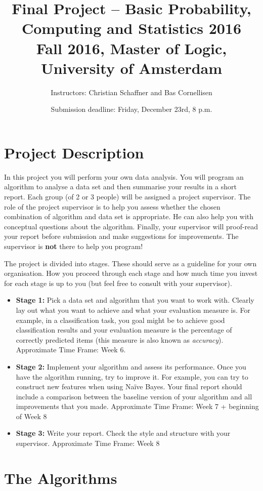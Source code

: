 \documentclass[11pt, leqno, a4paper]{article}
\title{Final Project -- Basic Probability, Computing and Statistics 2016 \\[2mm]
\large{Fall 2016, Master of Logic, University of Amsterdam}}
\author{Instructors: Christian Schaffner and Bas Cornellisen}
\date{Submission deadline: Friday, December 23rd, 8 p.m.}
\begin{document}
\maketitle

\section{Project Description}

In this project you will perform your own data analysis. You will program an algorithm to analyse a data set and then summarise your results in a short report.
Each group (of 2 or 3 people) will be assigned a project supervisor. The role of the project supervisor is to help you assess whether the chosen combination
of algorithm and data set is appropriate. He can also help you with conceptual questions about the algorithm. Finally, your supervisor will proof-read your report
before submission and make suggestions for improvements. The supervisor is \textbf{not} there to help you program!

The project is divided into stages. These should serve as a guideline for your own organisation. How you proceed through each stage and how much time you invest for each
stage is up to you (but feel free to consult with your supervisor).
\begin{itemize}
\item \textbf{Stage 1:} Pick a data set and algorithm that you want to work with. Clearly lay out what you want to achieve and what your evaluation measure is. For example,
in a classification task, you goal might be to achieve good classification results and your evaluation measure is the percentage of correctly predicted items (this measure
is also known as \textit{accuracy}). Approximate Time Frame: Week 6.
\item \textbf{Stage 2:} Implement your algorithm and assess its performance. Once you have the algorithm running, try to improve it. For example, you can try
to construct new features when using Na\"ive Bayes. Your final report should include a comparison between the baseline version of your algorithm and all improvements
that you made. Approximate Time Frame: Week 7 + beginning of Week 8
\item \textbf{Stage 3:} Write your report. Check the style and structure with your supervisor. Approximate Time Frame: Week 8
\end{itemize}

\section{The Algorithms}
\end{document}
